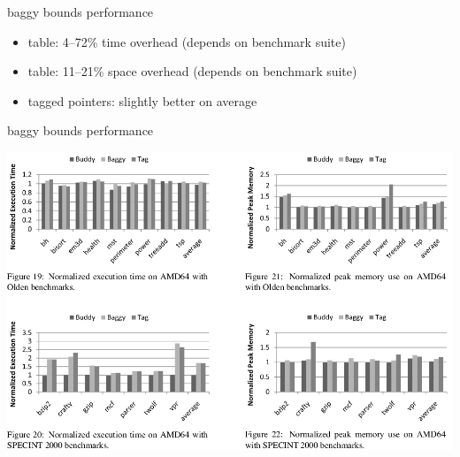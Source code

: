 
\begin{frame}{baggy bounds performance}
    \begin{itemize}
        \item table: 4--72\% time overhead (depends on benchmark suite)
        \item table: 11--21\% space overhead (depends on benchmark suite)
        \item tagged pointers: slightly better on average
    \end{itemize}
\end{frame}

\begin{frame}{baggy bounds performance}
    \begin{center}
    \includegraphics[height=0.8\textheight]{../bounds/baggy-bounds-perf}
    \end{center}
\end{frame}

